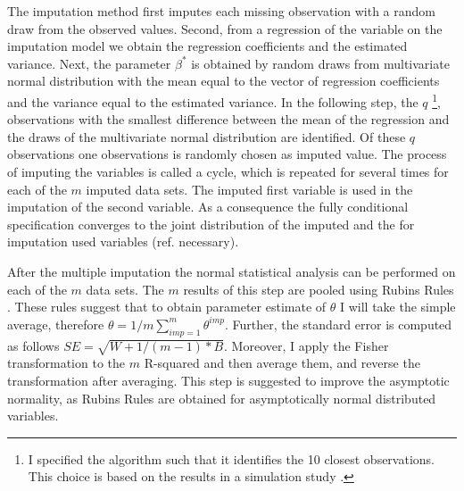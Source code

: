 The imputation method first imputes each missing observation with a random draw from the observed values.
Second, from a regression of the variable on the imputation model  we obtain the regression coefficients and the estimated variance.
Next, the parameter $\beta^*$ is obtained by random draws from multivariate normal distribution with the mean equal to the vector of regression coefficients and the variance equal to the estimated variance.
In the following step, the $q$ \footnote{I specified the algorithm such that it identifies the 10 closest observations.
 This choice is based on the results in a simulation study \textcite{Morris2014}.}, observations with the smallest difference between the mean of the regression and the draws of the multivariate normal distribution are identified.
Of these $q$ observations one observations is randomly chosen as imputed value.
The process of imputing the variables is called a cycle, which is repeated for several times for each of the $m$ imputed data sets.
The imputed first variable is used in the imputation of the second variable.
As a consequence the fully conditional specification converges to the joint distribution of the imputed and the for imputation used variables (ref. necessary).
  \par
  After the multiple imputation the normal statistical analysis can be performed on each of the $m$ data sets.
The $m$ results of this step are pooled using Rubins Rules \textcite[p.77]{Rubin1987}.
 These rules suggest that to obtain parameter estimate of $\theta$ I will take the simple average,
therefore $\theta=1/m  \sum_{imp=1} ^m \theta^{imp}$.
Further, the standard error is computed as follows $SE=\sqrt{W+ 1/(m-1)*B}$.
Moreover, I apply the Fisher transformation to the $m$ R-squared and then average them, and reverse the transformation after averaging.
This step is suggested to improve the asymptotic normality, as Rubins Rules are obtained for asymptotically normal distributed variables.
  \endinput
